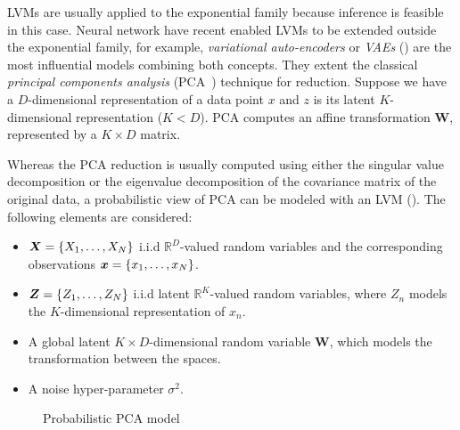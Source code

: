 
LVMs are usually applied to the exponential family because inference is feasible in this case. Neural network have recent enabled LVMs to be extended outside the exponential family, for example, \emph{variational auto-encoders} or \emph{VAEs} (\cite{kingma2013auto}) are the most influential models combining both concepts. They extent the classical \emph{principal components analysis} (PCA~\cite{pearson1901liii}) technique for  reduction. Suppose we have a \(D\)-dimensional representation of a data point \(x\) and \(z\) is its latent \(K\)-dimensional representation (\(K < D\)). PCA computes an affine transformation \(\bm{W}\), represented by a \(K \times D\) matrix.

Whereas the PCA reduction is usually computed using either the singular value decomposition or the eigenvalue decomposition of the covariance matrix of the original data, a probabilistic view of PCA can be modeled with an LVM (\cite{tipping1999probabilistic}). The following elements are considered:

\begin{itemize}
  \item \(\bm{X} = \{X_{1},\dots,X_{N}\}\) i.i.d \(\mathbb{R}^{D}\)-valued random variables and the corresponding observations \(\bm{x} = \{x_{1},\dots, x_{N}\}\).
  \item \(\bm{Z} = \{Z_{1}, \dots, Z_{N}\}\) i.i.d latent \(\mathbb{R}^{K}\)-valued random variables, where \(Z_{n}\) models the \(K\)-dimensional representation of \(x_{n}\).
  \item A global latent \(K\times D\)-dimensional random variable \(\bm{W}\), which models the transformation between the spaces.
  \item A noise hyper-parameter \(\sigma^{2}\).
\end{itemize}

\begin{figure}[h!]
  \centering
  \caption{Probabilistic PCA model}\label{fig:ppca}
\end{figure}



